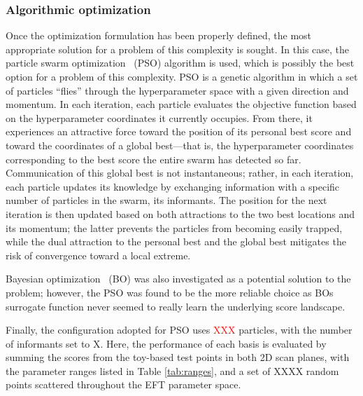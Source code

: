 \subsubsection{Algorithmic optimization}
%
Once the optimization formulation has been properly defined, the most appropriate solution for a problem of this complexity is sought. In this case, the particle swarm optimization~\cite{488968,Tani:2020dyi} (PSO) algorithm is used, which is possibly the best option for a problem of this complexity. PSO is a genetic algorithm in which a set of particles “flies” through the hyperparameter space with a given direction and momentum. In each iteration, each particle evaluates the objective function based on the hyperparameter coordinates it currently occupies. From there, it experiences an attractive force toward the position of its personal best score and toward the coordinates of a global best—that is, the hyperparameter coordinates corresponding to the best score the entire swarm has detected so far. Communication of this global best is not instantaneous; rather, in each iteration, each particle updates its knowledge by exchanging information with a specific number of particles in the swarm, its informants. The position for the next iteration is then updated based on both attractions to the two best locations and its momentum; the latter prevents the particles from becoming easily trapped, while the dual attraction to the personal best and the global best mitigates the risk of convergence toward a local extreme.

Bayesian optimization~\cite{BayesPaper1,BayesBook,Tani:2022izz} (BO) was also investigated as a potential solution to the problem; however, the PSO was found to be the more reliable choice as BOs surrogate function never seemed to really learn the underlying score landscape.

Finally, the configuration adopted for PSO uses \textcolor{red}{XXX} particles, with the number of informants set to X. Here, the performance of each basis is evaluated by summing the scores from the toy-based test points in both 2D scan planes, with the parameter ranges listed in Table \ref{tab:ranges}, and a set of XXXX random points scattered throughout the EFT parameter space.\medskip


